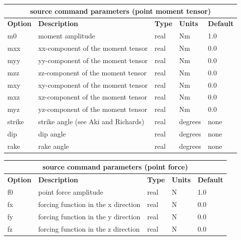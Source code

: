 \documentclass[11pt]{report}
\begin{document}
\begin{center}
\begin{tabular}{|l|p{8cm}|l|l|l|} \hline
\multicolumn{5}{|c|}{\bf source command parameters (point moment tensor)}\\ \hline
\bf{Option} & \bf{Description} & \bf{Type} & \bf{Units} & \bf{Default} \\ \hline \hline
m0 & moment amplitude & real & Nm & 1.0 \\ \hline
mxx & xx-component of the moment tensor & real & Nm & 0.0 \\ \hline
myy & yy-component of the moment tensor & real & Nm & 0.0 \\ \hline
mzz & zz-component of the moment tensor & real & Nm & 0.0 \\ \hline
mxy & xy-component of the moment tensor & real & Nm & 0.0 \\ \hline
mxz & xz-component of the moment tensor & real & Nm & 0.0 \\ \hline
myz & yz-component of the moment tensor & real & Nm & 0.0 \\ \hline
\hline
strike & strike angle (see Aki and Richards) & real & degrees & none \\ \hline
dip    & dip angle    & real & degrees & none \\ \hline
rake   & rake angle   & real & degrees & none \\ \hline
\end{tabular}
\end{center}
\begin{center}
\begin{tabular}{|l|p{8cm}|l|l|l|} \hline
\multicolumn{5}{|c|}{\bf source command parameters (point force)}\\ \hline
\bf{Option} & \bf{Description} & \bf{Type} & \bf{Units} & \bf{Default} \\ \hline \hline
f0 & point force amplitude & real & N & 1.0 \\ \hline
fx & forcing function in the x direction & real & N & 0.0 \\ \hline
fy & forcing function in the y direction & real & N & 0.0 \\ \hline
fz & forcing function in the z direction & real & N & 0.0 \\ \hline
\end{tabular}
\end{center}
\end{document}
